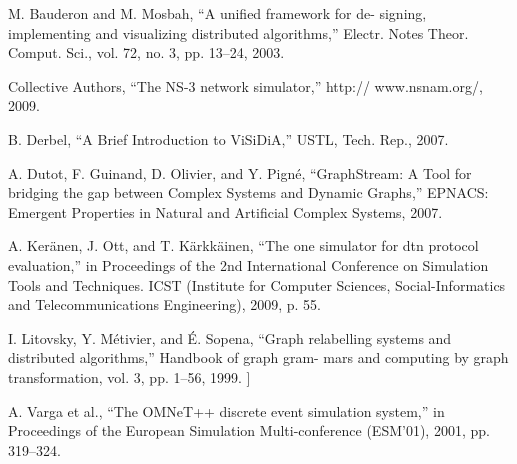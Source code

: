 \begin{thebibliography}{1}
	M. Bauderon and M. Mosbah, “A unified framework for de- signing, implementing and visualizing distributed algorithms,” Electr. Notes Theor. Comput. Sci., vol. 72, no. 3, pp. 13–24, 2003.
	
	Collective Authors, “The NS-3 network simulator,” http:// www.nsnam.org/, 2009.
	
	B. Derbel, “A Brief Introduction to ViSiDiA,” USTL, Tech. Rep., 2007.
	
	A. Dutot, F. Guinand, D. Olivier, and Y. Pigné, “GraphStream: A Tool for bridging the gap between Complex Systems and Dynamic Graphs,” EPNACS: Emergent Properties in Natural and Artificial Complex Systems, 2007.
	
	A. Keränen, J. Ott, and T. Kärkkäinen, “The one simulator for dtn protocol evaluation,” in Proceedings of the 2nd International Conference on Simulation Tools and Techniques. ICST (Institute for Computer Sciences, Social-Informatics and Telecommunications Engineering), 2009, p. 55.
	
	I. Litovsky, Y. Métivier, and É. Sopena, “Graph relabelling systems and distributed algorithms,” Handbook of graph gram- mars and computing by graph transformation, vol. 3, pp. 1–56, 1999. ]
	
	A. Varga et al., “The OMNeT++ discrete event simulation system,” in Proceedings of the European Simulation Multi-conference (ESM’01), 2001, pp. 319–324.
	
\end{thebibliography}